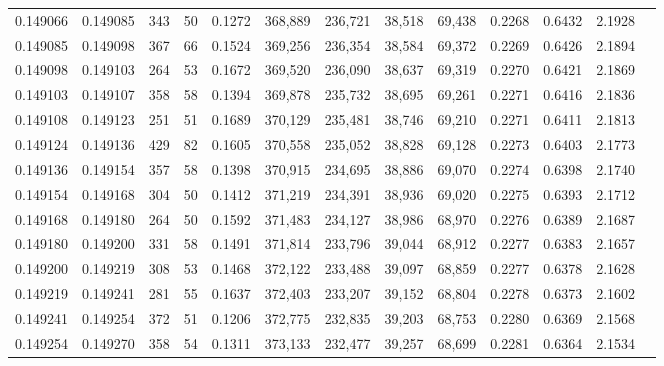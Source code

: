 \begin{tabular}{rrrrrrrrrrrrr}
0.149066 & 0.149085 &   343 &  50 &                                     0.1272 & 368,889 & 236,721 &  38,518 &  69,438 & 0.2268 & 0.6432 & 2.1928 \\
0.149085 & 0.149098 &   367 &  66 &                                     0.1524 & 369,256 & 236,354 &  38,584 &  69,372 & 0.2269 & 0.6426 & 2.1894 \\
0.149098 & 0.149103 &   264 &  53 &                                     0.1672 & 369,520 & 236,090 &  38,637 &  69,319 & 0.2270 & 0.6421 & 2.1869 \\
0.149103 & 0.149107 &   358 &  58 &                                     0.1394 & 369,878 & 235,732 &  38,695 &  69,261 & 0.2271 & 0.6416 & 2.1836 \\
0.149108 & 0.149123 &   251 &  51 &                                     0.1689 & 370,129 & 235,481 &  38,746 &  69,210 & 0.2271 & 0.6411 & 2.1813 \\
0.149124 & 0.149136 &   429 &  82 &                                     0.1605 & 370,558 & 235,052 &  38,828 &  69,128 & 0.2273 & 0.6403 & 2.1773 \\
0.149136 & 0.149154 &   357 &  58 &                                     0.1398 & 370,915 & 234,695 &  38,886 &  69,070 & 0.2274 & 0.6398 & 2.1740 \\
0.149154 & 0.149168 &   304 &  50 &                                     0.1412 & 371,219 & 234,391 &  38,936 &  69,020 & 0.2275 & 0.6393 & 2.1712 \\
0.149168 & 0.149180 &   264 &  50 &                                     0.1592 & 371,483 & 234,127 &  38,986 &  68,970 & 0.2276 & 0.6389 & 2.1687 \\
0.149180 & 0.149200 &   331 &  58 &                                     0.1491 & 371,814 & 233,796 &  39,044 &  68,912 & 0.2277 & 0.6383 & 2.1657 \\
0.149200 & 0.149219 &   308 &  53 &                                     0.1468 & 372,122 & 233,488 &  39,097 &  68,859 & 0.2277 & 0.6378 & 2.1628 \\
0.149219 & 0.149241 &   281 &  55 &                                     0.1637 & 372,403 & 233,207 &  39,152 &  68,804 & 0.2278 & 0.6373 & 2.1602 \\
0.149241 & 0.149254 &   372 &  51 &                                     0.1206 & 372,775 & 232,835 &  39,203 &  68,753 & 0.2280 & 0.6369 & 2.1568 \\
0.149254 & 0.149270 &   358 &  54 &                                     0.1311 & 373,133 & 232,477 &  39,257 &  68,699 & 0.2281 & 0.6364 & 2.1534 \\

\end{tabular}
